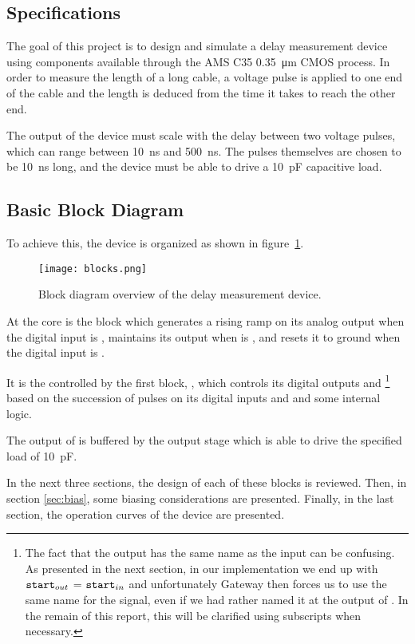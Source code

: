 \subsection{Specifications}
The goal of this project is to design and simulate a delay measurement device using components available through the AMS C35 \SI{0.35}{\micro\meter} CMOS process.
In order to measure the length of a long cable, a voltage pulse is applied to one end of the cable and the length is deduced from the time it takes to reach the other end.

The output of the device must scale with the delay between two voltage pulses, which can range between \SI{10}{\nano\second} and \SI{500}{\nano\second}.
The pulses themselves are chosen to be \SI{10}{\nano\second} long, and the device must be able to drive a \SI{10}{\pico\farad} capacitive load.

\subsection{Basic Block Diagram}
To achieve this, the device is organized as shown in figure~\ref{fig:block}.
\begin{figure}
  \centering
  \texttt{[image: blocks.png]}
  \caption{Block diagram overview of the delay measurement device.\label{fig:block}}
\end{figure}

At the core is the block  which generates a rising ramp on its analog output  when the digital input  is , maintains its output when  is , and resets it to ground when the digital input  is .

It is the controlled by the first block, , which controls its digital outputs  and \footnote{The fact that the output has the same name as the input can be confusing. As presented in the next section, in our implementation we end up with $\mathtt{start}_{out}$ = $\mathtt{start}_{in}$ and unfortunately Gateway then forces us to use the same name for the signal, even if we had rather named it  at the output of . In the remain of this report, this will be clarified using subscripts when necessary.} based on the succession of pulses on its digital inputs  and  and some internal logic.

The output of  is buffered by the output stage  which is able to drive the specified load of \SI{10}{\pico\farad}.

In the next three sections, the design of each of these blocks is reviewed. Then, in section \ref{sec:bias}, some biasing considerations are presented. Finally, in the last section, the operation curves of the device are presented.
